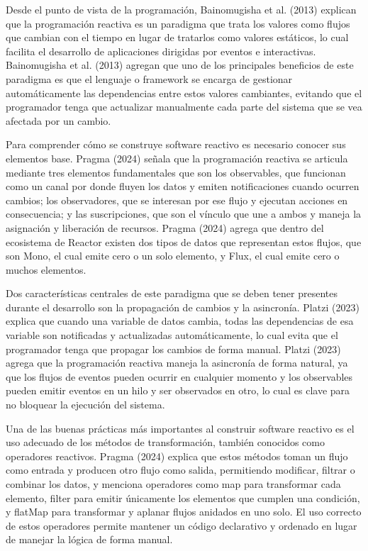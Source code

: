 \documentclass[12pt,letterpaper]{article}
\begin{document}
Desde el punto de vista de la programación, Bainomugisha et al. (2013) explican que la programación reactiva es un paradigma que trata los valores como flujos que cambian con el tiempo en lugar de tratarlos como valores estáticos, lo cual facilita el desarrollo de aplicaciones dirigidas por eventos e interactivas. Bainomugisha et al. (2013) agregan que uno de los principales beneficios de este paradigma es que el lenguaje o framework se encarga de gestionar automáticamente las dependencias entre estos valores cambiantes, evitando que el programador tenga que actualizar manualmente cada parte del sistema que se vea afectada por un cambio.

Para comprender cómo se construye software reactivo es necesario conocer sus elementos base. Pragma (2024) señala que la programación reactiva se articula mediante tres elementos fundamentales que son los observables, que funcionan como un canal por donde fluyen los datos y emiten notificaciones cuando ocurren cambios; los observadores, que se interesan por ese flujo y ejecutan acciones en consecuencia; y las suscripciones, que son el vínculo que une a ambos y maneja la asignación y liberación de recursos. Pragma (2024) agrega que dentro del ecosistema de Reactor existen dos tipos de datos que representan estos flujos, que son Mono, el cual emite cero o un solo elemento, y Flux, el cual emite cero o muchos elementos.

Dos características centrales de este paradigma que se deben tener presentes durante el desarrollo son la propagación de cambios y la asincronía. Platzi (2023) explica que cuando una variable de datos cambia, todas las dependencias de esa variable son notificadas y actualizadas automáticamente, lo cual evita que el programador tenga que propagar los cambios de forma manual. Platzi (2023) agrega que la programación reactiva maneja la asincronía de forma natural, ya que los flujos de eventos pueden ocurrir en cualquier momento y los observables pueden emitir eventos en un hilo y ser observados en otro, lo cual es clave para no bloquear la ejecución del sistema.

Una de las buenas prácticas más importantes al construir software reactivo es el uso adecuado de los métodos de transformación, también conocidos como operadores reactivos. Pragma (2024) explica que estos métodos toman un flujo como entrada y producen otro flujo como salida, permitiendo modificar, filtrar o combinar los datos, y menciona operadores como map para transformar cada elemento, filter para emitir únicamente los elementos que cumplen una condición, y flatMap para transformar y aplanar flujos anidados en uno solo. El uso correcto de estos operadores permite mantener un código declarativo y ordenado en lugar de manejar la lógica de forma manual.
\end{document}
